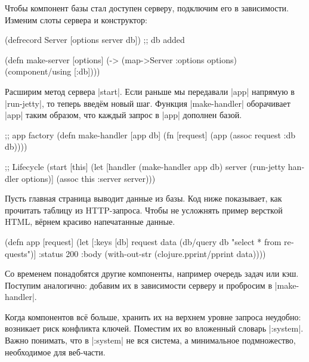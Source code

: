 Чтобы компонент базы стал доступен серверу, подключим его в зависимости. Изменим
слоты сервера и конструктор:

\begin{english}
  \begin{clojure}
(defrecord Server
  [options server db]) ;; db added

(defn make-server
  [options]
  (-> (map->Server {:options options})
      (component/using [:db])))
  \end{clojure}
\end{english}

Расширим метод сервера \spverb|start|. Если раньше мы передавали \spverb|app|
напрямую в \spverb|run-jetty|, то теперь введ\"{е}м новый шаг. Функция
\spverb|make-handler| оборачивает \spverb|app| таким образом, что каждый запрос
в \spverb|app| дополнен базой.

\begin{english}
  \begin{clojure}
;; app factory
(defn make-handler [app db]
  (fn [request]
    (app (assoc request :db db))))

;; Lifecycle
(start [this]
  (let [handler (make-handler app db)
        server (run-jetty handler options)]
    (assoc this :server server)))
  \end{clojure}
\end{english}

Пусть главная страница выводит данные из базы. Код ниже показывает, как
прочитать таблицу из HTTP-запроса. Чтобы не усложнять пример версткой HTML,
в\"{е}рнем красиво напечатанные данные.

\begin{english}
  \begin{clojure}
(defn app [request]
  (let [{:keys [db]} request
        data (db/query db "select * from requests")]
    {:status 200
     :body (with-out-str
             (clojure.pprint/pprint data))}))
  \end{clojure}
\end{english}

Со временем понадобятся другие компоненты, например очередь задач или
кэш. Поступим аналогично: добавим их в зависимости серверу и пробросим в
\spverb|make-handler|.

Когда компонентов вс\"{е} больше, хранить их на верхнем уровне запроса неудобно:
возникает риск конфликта ключей. Поместим их во вложенный словарь
\spverb|:system|. Важно понимать, что в \spverb|:system| не вся система, а
минимальное подмножество, необходимое для веб-части.

